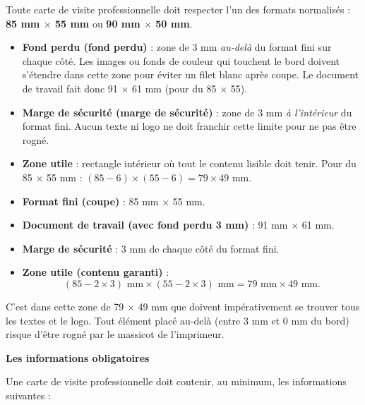 \documentclass[11pt]{article}
\newcommand{\cle}[1]{{\popxbold\color{popdark}#1}}
\begin{document}
\begin{propriete}
Toute carte de visite professionnelle doit respecter l'un des formats normalisés : \textbf{85 mm $\times$ 55 mm} ou \textbf{90 mm $\times$ 50 mm}.
\begin{itemize}
\item \textbf{Fond perdu (\cle{fond perdu})} : zone de 3 mm \emph{au-delà} du format fini sur chaque côté. Les images ou fonds de couleur qui touchent le bord doivent s'étendre dans cette zone pour éviter un filet blanc après coupe. Le document de travail fait donc 91 $\times$ 61 mm (pour du 85 $\times$ 55).
\item \textbf{Marge de sécurité (\cle{marge de sécurité})} : zone de 3 mm \emph{à l'intérieur} du format fini. Aucun texte ni logo ne doit franchir cette limite pour ne pas être rogné.
\item \textbf{Zone utile} : rectangle intérieur où tout le contenu lisible doit tenir. Pour du 85 $\times$ 55 mm : $(85-6) \times (55-6) = 79 \times 49$ mm.
\end{itemize}
\end{propriete}

\begin{exemplebox}
\begin{itemize}
\item \textbf{Format fini (coupe)} : 85 mm $\times$ 55 mm.
\item \textbf{Document de travail (avec fond perdu 3 mm)} : 91 mm $\times$ 61 mm.
\item \textbf{Marge de sécurité} : 3 mm de chaque côté du format fini.
\item \textbf{Zone utile (contenu garanti)} : 
\[ (85 - 2 \times 3) \text{ mm} \times (55 - 2 \times 3) \text{ mm} = 79 \text{ mm} \times 49 \text{ mm}. \]
\end{itemize}
C'est dans cette zone de 79 $\times$ 49 mm que doivent impérativement se trouver tous les textes et le logo. Tout élément placé au-delà (entre 3 mm et 0 mm du bord) risque d'être rogné par le massicot de l'imprimeur.
\end{exemplebox}

\textbf{Les informations obligatoires}

Une carte de visite professionnelle doit contenir, au minimum, les informations suivantes :
\end{document}
